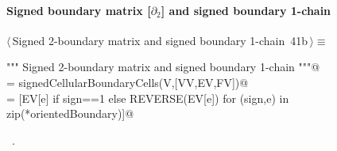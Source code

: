 \documentclass[11pt,oneside]{article}    %
\begin{document}
\paragraph{Signed boundary matrix [$\partial_2$] and signed boundary 1-chain}
\begin{flushleft} \small \label{scrap66}
\protect{}$\langle\,$Signed 2-boundary matrix and signed boundary 1-chain\nobreak\ {\footnotesize 41b}$\,\rangle\equiv$
\vspace{-1ex}
\begin{list}{}{} \item
\mbox{}\verb@""" Signed 2-boundary matrix  and signed boundary 1-chain """@\\
\mbox{}\verb@orientedBoundary = signedCellularBoundaryCells(V,[VV,EV,FV])@\\
\mbox{}\verb@cells = [EV[e] if sign==1 else REVERSE(EV[e]) for (sign,e) in zip(*orientedBoundary)]@\\
\mbox{}\verb@@{\NWsep}
\end{list}
\vspace{-1ex}
\footnotesize\addtolength{\baselineskip}{-1ex}
\begin{list}{}{\setlength{\itemsep}{-\parsep}\setlength{\itemindent}{-\leftmargin}}
\item \NWtxtMacroRefIn\ .
\end{list}
\end{flushleft}
\end{document}
